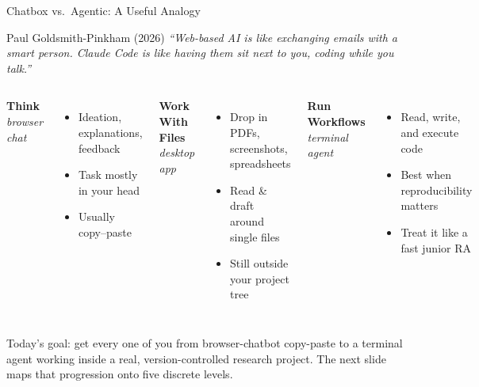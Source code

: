 \documentclass[aspectratio=169,10pt]{beamer}
\newcommand{\emphc}[1]{\textcolor{harvardcrimson}{#1}}
\begin{document}
\begin{frame}{Chatbox vs.\ Agentic: A Useful Analogy}
\scriptsize
\begin{alertblock}{Paul Goldsmith-Pinkham (2026)}
\itshape
``Web-based AI is like exchanging emails with a smart person.
Claude Code is like having them sit next to you, coding while you talk.''
\end{alertblock}

\vspace{0.2em}
\begin{columns}[T]
\textbf{Think} \hfill \emph{browser chat}
\begin{itemize}\itemsep0pt
  \item Ideation, explanations, feedback
  \item Task mostly in your head
  \item Usually copy--paste
\end{itemize}

\textbf{Work With Files} \hfill \emph{desktop app}
\begin{itemize}\itemsep0pt
  \item Drop in PDFs, screenshots, spreadsheets
  \item Read \& draft around single files
  \item Still outside your project tree
\end{itemize}

\textbf{Run Workflows} \hfill \emph{terminal agent}
\begin{itemize}\itemsep0pt
  \item Read, write, and execute code
  \item Best when reproducibility matters
  \item Treat it like a \emphc{fast junior RA}
\end{itemize}
\end{columns}

\vspace{0.4em}
\emphc{Today's goal:} get every one of you from browser-chatbot copy-paste to
a terminal agent working inside a real, version-controlled research project.
The next slide maps that progression onto five discrete levels.
\end{frame}
\end{document}
